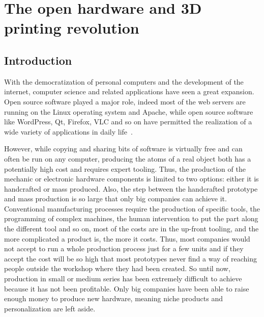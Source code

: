 
\cleartoleftpage


\chapter{The open hardware and 3D printing revolution}
\label{cha:3Dprint-OSH}



\section{Introduction} %

With the democratization of personal computers and the development of the internet, computer science and related applications have seen a great expansion. Open source software played a major role, indeed most of the web servers are running on the Linux operating system and Apache, while open source software like WordPress, Qt, Firefox, VLC and so on have permitted the realization of a wide variety of applications in daily life~\parencite{peeling2001analysis}.

However, while copying and sharing bits of software is virtually free and can often be run on any computer, producing the atoms of a real object both has a potentially high cost and requires expert tooling. Thus, the production of the mechanic or electronic hardware components is limited to two options: either it is handcrafted or mass produced. Also, the step between the handcrafted prototype and mass production is so large that only big companies can achieve it. Conventional manufacturing processes require the production of specific tools, the programming of complex machines, the human intervention to put the part along the different tool and so on, most of the costs are in the up-front tooling, and the more complicated a product is, the more it costs. Thus, most companies would not accept to run a whole production process just for a few units and if they accept the cost will be so high that most prototypes never find a way of reaching people outside the workshop where they had been created. So until now, production in small or medium series has been extremely difficult to achieve because it has not been profitable.
Only big companies have been able to raise enough money to produce new hardware, meaning niche products and personalization are left aside.

